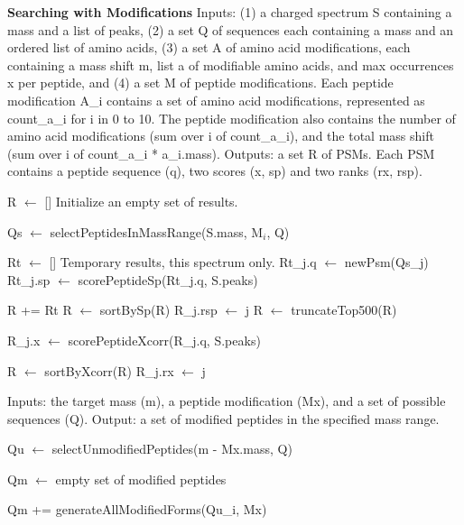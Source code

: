 \documentclass[12pt]{article}
\begin{document}
\begin{algorithm}
\caption{{\bf Searching with Modifications} Inputs: (1) a charged
  spectrum S containing a mass and a list of peaks, (2) a set Q of
  sequences each containing a mass and an ordered list of amino acids,
  (3) a set A of amino acid modifications, each containing a mass
  shift m, list a of modifiable amino acids, and max occurrences x per
  peptide, and (4) a set M of peptide modifications.  Each peptide
  modification A\_i contains a set of amino acid modifications,
  represented as count\_a\_i for i in 0 to 10.  The peptide
  modification also contains the number of amino acid modifications
  (sum over i of count\_a\_i), and the total mass shift (sum over i of
  count\_a\_i * a\_i.mass). Outputs: a set R of PSMs.  Each PSM
  contains a peptide sequence (q), two scores (x, sp) and two ranks
  (rx, rsp).}

\begin{algorithmic}[1]

\State R $\gets$ []
\Comment Initialize an empty set of results.

   \State Qs $\gets$ selectPeptidesInMassRange(S.mass, M$_i$, Q)

   \State Rt $\gets$ []
   \Comment Temporary results, this spectrum only.
     \State Rt\_j.q $\gets$ newPsm(Qs\_j)
     \State Rt\_j.sp $\gets$ scorePeptideSp(Rt\_j.q, S.peaks)
   \EndFor

   \State R += Rt
   \State R $\gets$ sortBySp(R)
     \State R\_j.rsp $\gets$ j
   \EndFor
   \State R $\gets$ truncateTop500(R)

     \State R\_j.x $\gets$ scorePeptideXcorr(R\_j.q, S.peaks)
   \EndFor

   \State R $\gets$ sortByXcorr(R)
     \State R\_j.rx $\gets$ j
   \EndFor

\EndFor

\State {}
\EndProcedure
\end{algorithmic}
\end{algorithm}

\begin{algorithm}
\caption{ Inputs: the target mass (m), a peptide modification (Mx),
  and a set of possible sequences (Q).  Output: a set of modified
  peptides in the specified mass range.}

\begin{algorithmic}[1]
  \State Qu $\gets$ selectUnmodifiedPeptides(m - Mx.mass, Q)
   
  \State Qm $\gets$ empty set of modified peptides

      \State Qm += generateAllModifiedForms(Qu\_i, Mx)
    \EndIf
  \EndFor

  \State {}
\EndProcedure
\end{algorithmic}
\end{algorithm}
\end{document}
